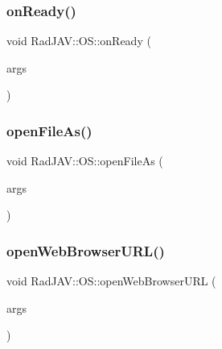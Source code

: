 \mbox{\label{class_rad_j_a_v_1_1_o_s_a960d61a9a7007bd45a9448786fffb640}} 
\subsubsection{\texorpdfstring{on\+Ready()}{onReady()}}
{\footnotesize\ttfamily void Rad\+J\+A\+V\+::\+O\+S\+::on\+Ready (\begin{DoxyParamCaption}\item[{const v8\+::\+Function\+Callback\+Info$<$ v8\+::\+Value $>$ \&}]{args }\end{DoxyParamCaption})\hspace{0.3cm}{\ttfamily [static]}}

\mbox{\label{class_rad_j_a_v_1_1_o_s_ad364693e2c5006a106bee573ae1f2a2f}} 
\subsubsection{\texorpdfstring{open\+File\+As()}{openFileAs()}}
{\footnotesize\ttfamily void Rad\+J\+A\+V\+::\+O\+S\+::open\+File\+As (\begin{DoxyParamCaption}\item[{const v8\+::\+Function\+Callback\+Info$<$ v8\+::\+Value $>$ \&}]{args }\end{DoxyParamCaption})\hspace{0.3cm}{\ttfamily [static]}}

\mbox{\label{class_rad_j_a_v_1_1_o_s_a72a5afc1380fa26d24c32a2b81abb5b5}} 
\subsubsection{\texorpdfstring{open\+Web\+Browser\+U\+R\+L()}{openWebBrowserURL()}}
{\footnotesize\ttfamily void Rad\+J\+A\+V\+::\+O\+S\+::open\+Web\+Browser\+U\+RL (\begin{DoxyParamCaption}\item[{const v8\+::\+Function\+Callback\+Info$<$ v8\+::\+Value $>$ \&}]{args }\end{DoxyParamCaption})\hspace{0.3cm}{\ttfamily [static]}}

